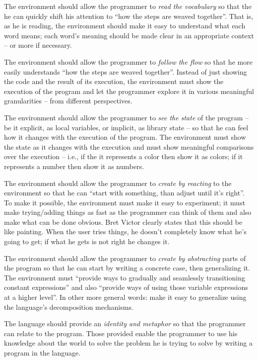 \documentclass{./llncs2e/llncs}
\begin{document}
The environment should allow the programmer to \emph{read the vocabulary} so that the he can quickly shift his attention to ``how the steps are weaved together''. That is, as he is reading, the environment should make it easy to understand what each word means; each word's meaning should be made clear in an appropriate context -- or more if necessary.

The environment should allow the programmer to \emph{follow the flow} so that he more easily understands ``how the steps are weaved together''. Instead of just showing the code and the result of its execution, the environment must show the execution of the program and let the programmer explore it in various meaningful granularities -- from different perspectives.

The environment should allow the programmer to \emph{see the state} of the program -- be it explicit, as local variables, or implicit, as library state -- so that he can feel how it changes with the execution of the program. The environment must show the state as it changes with the execution and must show meaningful comparisons over the execution -- i.e., if the it represents a color then show it as colors; if it represents a number then show it as numbers.

The environment should allow the programmer to \emph{create by reacting} to the environment so that he can ``start with something, than adjust until it's right''. To make it possible, the environment must make it easy to experiment; it must make trying/adding things as fast as the programmer can think of them and also make what can be done obvious. Bret Victor clearly states that this should be like painting. When the user tries things, he doesn't completely know what he's going to get; if what he gets is not right he changes it.

The environment should allow the programmer to \emph{create by abstracting} parts of the program so that he can start by writing a concrete case, then generalizing it. The environment must ``provide ways to gradually and seamlessly transitioning constant expressions'' and also ``provide ways of using those variable expressions at a higher level''. In other more general words: make it easy to generalize using the language's decomposition mechanisms. 

The language should provide an \emph{identity and metaphor} so that the programmer can relate to the program. Those provided enable the programmer to use his knowledge about the world to solve the problem he is trying to solve by writing a program in the language.
\end{document}
